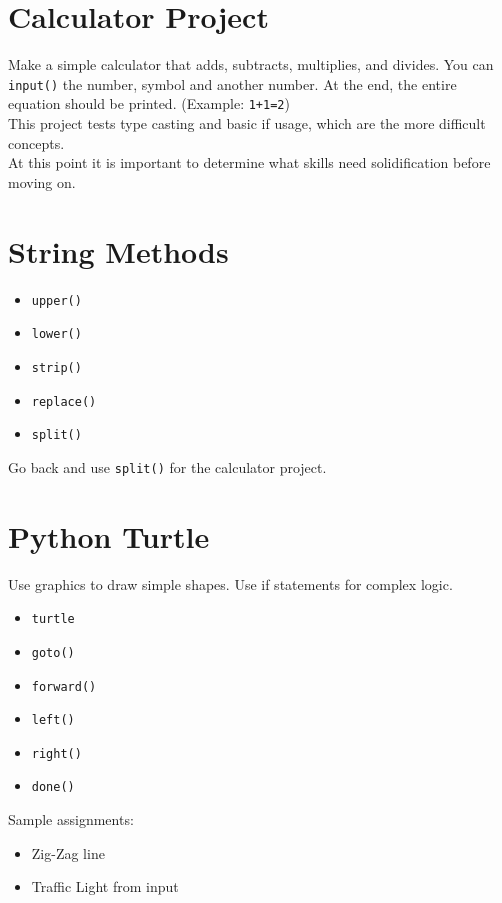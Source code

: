 \documentclass{article}
\begin{document}
\section{Calculator Project}

Make a simple calculator that adds, subtracts, multiplies, and divides.
You can \verb|input()| the number, symbol and another number. At the end, the entire equation should be printed. (Example: \verb|1+1=2|) \\

This project tests type casting and basic if usage, which are the more difficult concepts. \\

At this point it is important to determine what skills need solidification before moving on. 

\section{String Methods}

\begin{itemize}
    \item \verb|upper()|
    \item \verb|lower()|
    \item \verb|strip()|
    \item \verb|replace()|
    \item \verb|split()|
\end{itemize}

Go back and use \verb|split()| for the calculator project.


\section{Python Turtle}

Use graphics to draw simple shapes. Use if statements for complex logic.

\begin{itemize}
    \item \verb|turtle|
    \item \verb|goto()|
    \item \verb|forward()|
    \item \verb|left()|
    \item \verb|right()|
    \item \verb|done()|
\end{itemize}

Sample assignments:

\begin{itemize}
    \item Zig-Zag line
    \item Traffic Light from input
\end{itemize}
\end{document}
